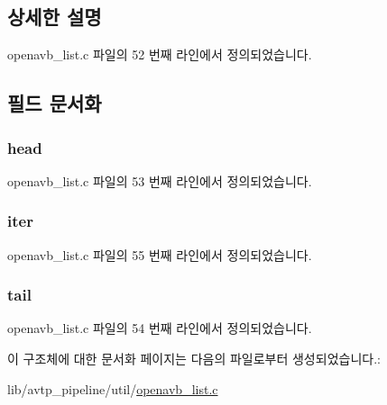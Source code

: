 \subsection{상세한 설명}


openavb\+\_\+list.\+c 파일의 52 번째 라인에서 정의되었습니다.



\subsection{필드 문서화}
\subsubsection[{\texorpdfstring{head}{head}}]{ head}\hypertarget{structopenavb__list_af175e9f84f7aff58e5c89fe762ba6c51}{}\label{structopenavb__list_af175e9f84f7aff58e5c89fe762ba6c51}


openavb\+\_\+list.\+c 파일의 53 번째 라인에서 정의되었습니다.

\subsubsection[{\texorpdfstring{iter}{iter}}]{ iter}\hypertarget{structopenavb__list_a5e9ddd716fff13022cd48692d2b18e7f}{}\label{structopenavb__list_a5e9ddd716fff13022cd48692d2b18e7f}


openavb\+\_\+list.\+c 파일의 55 번째 라인에서 정의되었습니다.

\subsubsection[{\texorpdfstring{tail}{tail}}]{ tail}\hypertarget{structopenavb__list_a73f16ebcb703df1b9bfa7dfc68a7ca6c}{}\label{structopenavb__list_a73f16ebcb703df1b9bfa7dfc68a7ca6c}


openavb\+\_\+list.\+c 파일의 54 번째 라인에서 정의되었습니다.



이 구조체에 대한 문서화 페이지는 다음의 파일로부터 생성되었습니다.\+:\begin{DoxyCompactItemize}
\item 
lib/avtp\+\_\+pipeline/util/\hyperlink{openavb__list_8c}{openavb\+\_\+list.\+c}\end{DoxyCompactItemize}
